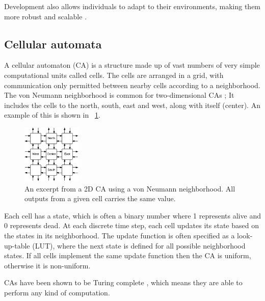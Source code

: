 Development also allows individuals to adapt to their environments, making them more robust and scalable \cite{tufte2008evodevo}.

\subsection{Cellular automata}


A cellular automaton (CA) is a structure made up of vast numbers of very simple computational units called cells.
The cells are arranged in a grid, with communication only permitted between nearby cells according to a neighborhood.
The von Neumann neighborhood is common for two-dimensional CAs \CN;
It includes the cells to the north, south, east and west, along with itself (center).
An example of this is shown in \figurename~\ref{fig:ca}.

\begin{figure}[!ht]
    \centering
    \includegraphics[width=0.25\textwidth]{figures/ca}
    \caption{An excerpt from a 2D CA using a von Neumann neighborhood. All outputs from a given cell carries the same value.}
    \label{fig:ca}
\end{figure}

Each cell has a state, which is often a binary number where 1 represents alive and 0 represents dead.
At each discrete time step, each cell updates its state based on the states in its neighborhood.
The update function is often specified as a look-up-table (LUT), where the next state is defined for all possible neighborhood states\footnotemark.
If all cells implement the same update function then the CA is uniform, otherwise it is non-uniform.

CAs have been shown to be Turing complete \cite{neumann1966selfreplication} \cite{codd1968cellular}, which means they are able to perform any kind of computation.

